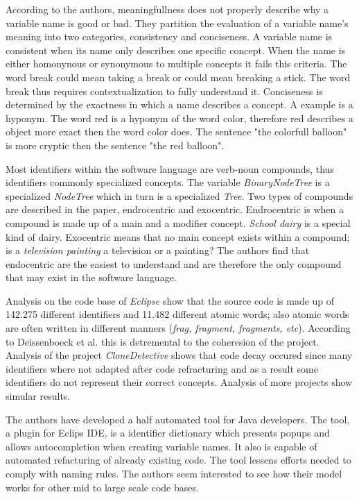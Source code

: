 \documentclass[a4paper,12pt]{article}
\begin{document}
According to the authors, meaningfullness does not properly describe why a variable name is good or bad. They partition the evaluation of a variable name's meaning into two categories, consistency and conciseness. A variable name is consistent when its name only describes one specific concept. When the name is either homonynous or synonymous to multiple concepts it fails this criteria. The word break could mean taking a break or could mean breaking a stick. The word break thus requires contextualization to fully understand it. Conciseness is determined by the exactness in which a name describes a concept. A example is a hyponym. The word red is a hyponym of the word color, therefore red describes a object more exact then the word color does. The sentence "the colorfull balloon" is more cryptic then the sentence "the red balloon".

Most identifiers within the software language are verb-noun compounds, thus identifiers commonly specialized concepts. The variable \textit{BinaryNodeTree} is a specialized \textit{NodeTree} which in turn is a specialized \textit{Tree}. Two types of compounds are described in the paper, endrocentric and exocentric. Endrocentric is when a compound is made up of a main and a modifier concept. \textit{School dairy} is a special kind of dairy. Exocentric means that no main concept exists within a compound; is a \textit{television painting} a television or a painting? The authors find that endocentric are the easiest to understand and are therefore the only compound that may exist in the software language.

Analysis on the code base of \textit{Eclipse} show that the source code is made up of 142.275 different identifiers and 11.482 different atomic words; also atomic words are often written in different manners (\textit{frag, fragment, fragments, etc}). According to Deissenboeck et al. this is detremental to the coheresion of the project. Analysis of the project \textit{CloneDetective} shows that code decay occured since many identifiers where not adapted after code refracturing and as a result some identifiers do not represent their correct concepts. Analysis of more projects show simular results.

The authors have developed a half automated tool for Java developers. The tool, a plugin for Eclips IDE, is a identifier dictionary which presents popups and allows autocompletion when creating variable names. It also is capable of automated refacturing of already existing code. The tool lessens efforts needed to comply with naming rules. The authors seem interested to see how their model works for other mid to large scale code bases.
\end{document}
